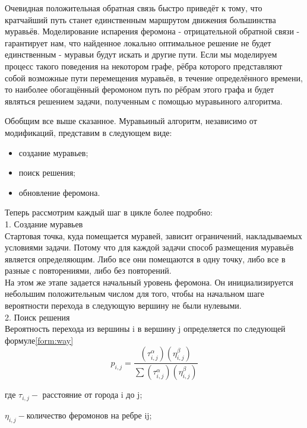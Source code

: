 \documentclass[12pt]{report}
\begin{document}
Очевидная положительная обратная связь быстро приведёт к тому, что кратчайший путь станет единственным маршрутом движения большинства муравьёв. Моделирование испарения феромона - отрицательной обратной связи - гарантирует нам, что найденное локально оптимальное решение не будет единственным - муравьи будут искать и другие пути. Если мы моделируем процесс такого поведения на некотором графе, рёбра которого представляют собой возможные пути перемещения муравьёв, в течение определённого времени, то наиболее обогащённый феромоном путь по рёбрам этого графа и будет являться решением задачи, полученным с помощью муравьиного алгоритма.

Обобщим все выше сказанное. Муравьиный алгоритм, независимо от модификаций, представим в следующем виде:
\begin{itemize}
	\item создание муравьев;
	\item поиск решения;
	\item обновление феромона.
\end{itemize}

Теперь рассмотрим каждый шаг в цикле более подробно:\\

1. Создание муравьев\\
Стартовая точка, куда помещается муравей, зависит ограничений,   накладываемых условиями задачи. Потому что для каждой задачи   способ размещения муравьёв является определяющим. Либо все они помещаются в одну точку, либо все в разные с повторениями, либо без повторений. \\

На этом же этапе задается начальный уровень феромона. Он    инициализируется небольшим положительным числом для того, чтобы на начальном шаге вероятности перехода в следующую вершину не были нулевыми. \\

2. Поиск решения  \\
Вероятность перехода из вершины i в вершину j определяется по следующей формуле\ref{form:way}\\   
\begin{equation}\label{form:way} 
	p_{i,j}={\frac {(\tau _{i,j}^{\alpha })(\eta _{i,j}^{\beta })}{\sum (\tau _{i,j}^{\alpha })(\eta _{i,j}^{\beta })}}
\end{equation}

где $ \tau _{i,j} - $ расстояние от города i до j;

$\eta _{i,j} - $количество феромонов на ребре ij;
\end{document}
